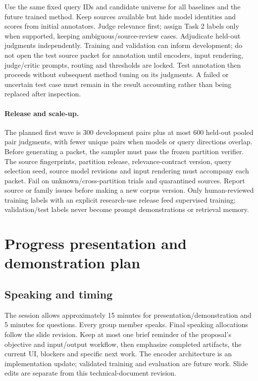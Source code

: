 \documentclass[10pt,letterpaper]{article}
\begin{document}
Use the same fixed query IDs and candidate universe for all baselines and the
future trained method. Keep sources available but hide model identities and
scores from initial annotators. Judge relevance first; assign Task 2 labels only
when supported, keeping ambiguous/source-review cases. Adjudicate held-out
judgments independently. Training and validation can inform development;
do not open the test source packet for annotation until encoders, input
rendering, judge/critic prompts, routing and thresholds are locked. Test
annotation then proceeds without subsequent method tuning on its judgments. A failed or uncertain test case must remain
in the result accounting rather than being replaced after inspection.

\paragraph{Release and scale-up.}
The planned first wave is 300 development pairs plus at most 600 held-out pooled
pair judgments, with fewer unique pairs when models or query directions overlap.
Before generating a packet, the sampler must pass the frozen partition verifier.
The source fingerprints, partition release, relevance-contract version, query
selection seed, source model revisions and input rendering must accompany each
packet. Fail on unknown/cross-partition trials and quarantined sources. Report
source or family issues before making a new corpus version. Only human-reviewed
training labels with an explicit research-use release feed supervised training;
validation/test labels never become prompt demonstrations or retrieval memory.

\clearpage
\section{Progress presentation and demonstration plan}\label{demo-progress-presentation-and-demonstration-plan}\label{sec:demoworkingnotes}
\subsection{Speaking and timing}\label{demo-speaking-and-timing}
The session allows approximately 15 minutes for presentation/demonstration
and 5 minutes for questions. Every group member speaks. Final speaking
allocations follow the slide revision.
Keep at most one brief reminder of the proposal's objective and input/output
workflow, then emphasize completed artifacts, the current UI, blockers and
specific next work. The encoder architecture is an implementation update;
validated training and evaluation are future work. Slide edits are separate
from this technical-document revision.
\end{document}
